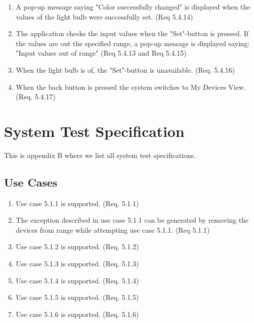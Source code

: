 \documentclass[a4paper]{article}
\newlength{\testlabellength}
\newenvironment{testlist}{\begin{enumerate}[label=\bfseries Test \thesubsection.\arabic* , labelindent=0pt, labelwidth=\testlabellength , leftmargin=2cm]}{\end{enumerate}}
\begin{document}
\begin{appendices}
\begin{testlist}
    \item A pop-up message saying "Color successfully changed" is displayed when the values of the light bulb were successfully set. (Req 5.4.14)
    
    \item The application checks the input values when the "Set"-button is pressed. If the values are out the specified range, a pop-up message is displayed saying: "Input values out of range" (Req 5.4.13 and Req 5.4.15)
    
    \item When the light bulb is of, the "Set"-button is unavailable. (Req. 5.4.16)
    
    \item When the back button is pressed the system switches to My Devices View. (Req. 5.4.17)

\end{testlist}	

\newpage

\section{System Test Specification} \label{appendix:section:systemtest}
This is appendix B where we list all system test specifications.

\subsection{Use Cases}
\begin{testlist}
	\item Use case 5.1.1 is supported. (Req. 5.1.1)
	\item The exception described in use case 5.1.1 can be generated by removing the devices from range while attempting use case 5.1.1. (Req 5.1.1)
	
	\item Use case 5.1.2 is supported. (Req. 5.1.2)
	
	\item Use case 5.1.3 is supported. (Req. 5.1.3)
	
	\item Use case 5.1.4 is supported. (Req. 5.1.4)
	
	\item Use case 5.1.5 is supported. (Req. 5.1.5)
	
	\item Use case 5.1.6 is supported. (Req. 5.1.6)
	

\end{testlist}
\end{appendices}
\end{document}
